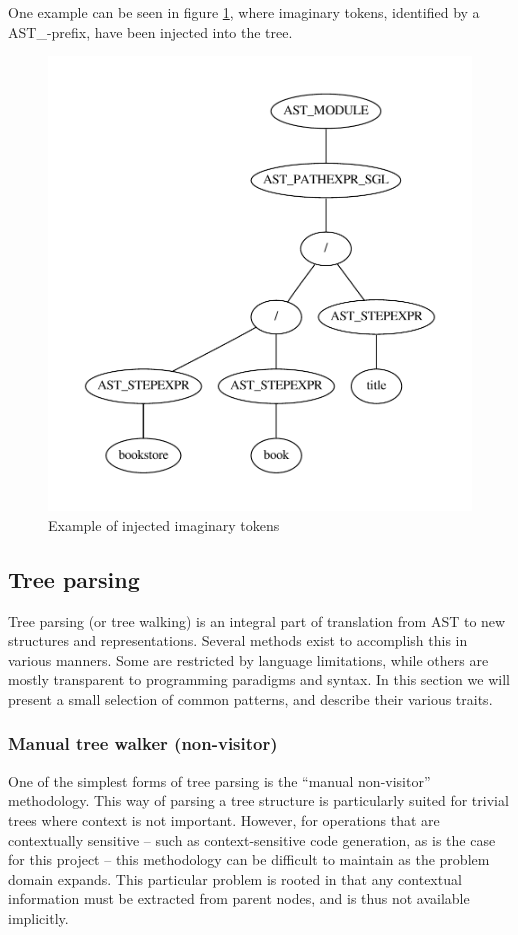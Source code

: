 One example can be seen in figure \ref{figure:parser:imaginary_tokens_path},
where imaginary tokens, identified by a AST\_-prefix, have been injected into the tree.

\begin{figure}[h]
  \centering
    \includegraphics[scale=0.50]{img/graphs/path1} 
  \caption{Example of injected imaginary tokens}
  \label{figure:parser:imaginary_tokens_path}
\end{figure}

\subsection{Tree parsing}
\label{sect:theory:parser:tree_parsing}
Tree parsing (or tree walking) is an integral part of translation from AST to
new structures and representations. Several methods exist to accomplish this in
various manners. Some are restricted by language limitations, while others are
mostly transparent to programming paradigms and syntax. In this section we will
present a small selection of common patterns, and describe their various traits.

\subsubsection{Manual tree walker (non-visitor)}
\label{sect:theory:manual_walker}
One of the simplest forms of tree parsing is the ``manual non-visitor''
methodology. This way of parsing a tree structure is particularly suited for
trivial trees where context is not important. However, for operations that are
contextually sensitive -- such as context-sensitive code generation, as is the
case for this project -- this methodology can be difficult to maintain as the
problem domain expands. This particular problem is rooted in that any
contextual information must be extracted from parent nodes, and is thus not
available implicitly.

